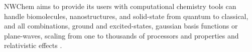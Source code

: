 NWChem aims to provide its users with computational chemistry tools can handle biomolecules, nanostructures, and solid-state from quantum to classical, and all combinations, ground and excited-states, gaussian basis functions or plane-waves, scaling from one to thousands of processors and properties and relativistic effects \cite{Valiev_2010}.